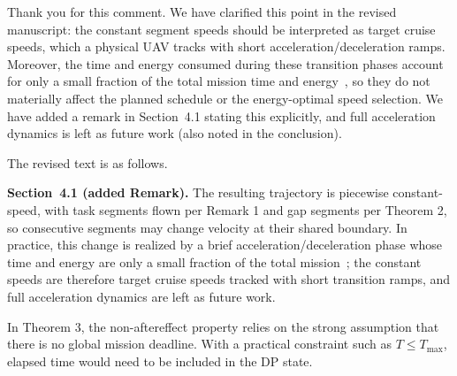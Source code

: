 \begin{revresponse}[]
	Thank you for this comment. We have clarified this point in the revised manuscript: the constant segment speeds should be interpreted as target cruise speeds, which a physical UAV tracks with short acceleration/deceleration ramps. Moreover, the time and energy consumed during these transition phases account for only a small fraction of the total mission time and energy~\cite{msmo}, so they do not materially affect the planned schedule or the energy-optimal speed selection. We have added a remark in Section~4.1 stating this explicitly, and full acceleration dynamics is left as future work (also noted in the conclusion).

	The revised text is as follows.
	\begin{changes}
		\textbf{Section~4.1 (added Remark).} The resulting trajectory is piecewise constant-speed, with task segments flown per Remark 1 and gap segments per Theorem 2, so consecutive segments may change velocity at their shared boundary. In practice, this change is realized by a brief acceleration/deceleration phase whose time and energy are only a small fraction of the total mission~\cite{msmo}; the constant speeds are therefore target cruise speeds tracked with short transition ramps, and full acceleration dynamics are left as future work.
	\end{changes}
\end{revresponse}

\begin{revcomment}
	In Theorem 3, the non-aftereffect property relies on the strong assumption that there is no global mission deadline. With a practical constraint such as $T \leq T_{\max}$, elapsed time would need to be included in the DP state.
\end{revcomment}

